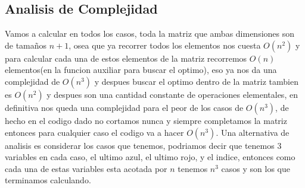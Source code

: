 \subsection*{Analisis de Complejidad}
Vamos a calcular en todos los casos, toda la matriz que ambas dimensiones son de tamaños $n+1$, osea que ya recorrer todos los elementos nos cuesta $O(n^2)$ y para calcular cada una de estos elementos de la matriz recorremos $O(n)$ elementos(en la funcion auxiliar para buscar el optimo), eso ya nos da una complejidad de $O(n^3)$ y despues buscar el optimo dentro de la matriz tambien es $O(n^2)$ y despues son una cantidad constante de operaciones elementales, en definitiva nos queda una complejidad para el peor de los casos de $O(n^3)$, de hecho en el codigo dado no cortamos nunca y siempre completamos la matriz entonces para cualquier caso el codigo va a hacer $O(n^3)$. Una alternativa de analisis es considerar los casos que tenemos, podriamos decir que tenemos 3 variables en cada caso, el ultimo azul, el ultimo rojo, y el indice, entonces como cada una de estas variables esta acotada por $n$ tenemos $n^3$ casos y son los que terminamos calculando.


